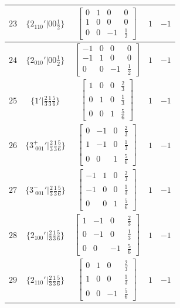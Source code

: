\documentclass[fleqn,8pt]{jsarticle}
\begin{document}
\begin{longtable}{ccccc}
$ 23 $ & $ \{2{}_{110}{}'|0 0 \frac{1}{2}\} $ & $ \begin{bmatrix} 0 & 1 & 0 & 0 \\ 1 & 0 & 0 & 0 \\ 0 & 0 & -1 & \frac{1}{2} \end{bmatrix} $ & $ 1 $ & $ -1 $ \\ \hline
$ 24 $ & $ \{2{}_{010}{}'|0 0 \frac{1}{2}\} $ & $ \begin{bmatrix} -1 & 0 & 0 & 0 \\ -1 & 1 & 0 & 0 \\ 0 & 0 & -1 & \frac{1}{2} \end{bmatrix} $ & $ 1 $ & $ -1 $ \\ \hline
$ 25 $ & $ \{1{}'|\frac{2}{3} \frac{1}{3} \frac{5}{6}\} $ & $ \begin{bmatrix} 1 & 0 & 0 & \frac{2}{3} \\ 0 & 1 & 0 & \frac{1}{3} \\ 0 & 0 & 1 & \frac{5}{6} \end{bmatrix} $ & $ 1 $ & $ -1 $ \\ \hline
$ 26 $ & $ \{3^{+}_{\,\,001}{}'|\frac{2}{3} \frac{1}{3} \frac{5}{6}\} $ & $ \begin{bmatrix} 0 & -1 & 0 & \frac{2}{3} \\ 1 & -1 & 0 & \frac{1}{3} \\ 0 & 0 & 1 & \frac{5}{6} \end{bmatrix} $ & $ 1 $ & $ -1 $ \\ \hline
$ 27 $ & $ \{3^{-}_{\,\,001}{}'|\frac{2}{3} \frac{1}{3} \frac{5}{6}\} $ & $ \begin{bmatrix} -1 & 1 & 0 & \frac{2}{3} \\ -1 & 0 & 0 & \frac{1}{3} \\ 0 & 0 & 1 & \frac{5}{6} \end{bmatrix} $ & $ 1 $ & $ -1 $ \\ \hline
$ 28 $ & $ \{2{}_{100}{}'|\frac{2}{3} \frac{1}{3} \frac{5}{6}\} $ & $ \begin{bmatrix} 1 & -1 & 0 & \frac{2}{3} \\ 0 & -1 & 0 & \frac{1}{3} \\ 0 & 0 & -1 & \frac{5}{6} \end{bmatrix} $ & $ 1 $ & $ -1 $ \\ \hline
$ 29 $ & $ \{2{}_{110}{}'|\frac{2}{3} \frac{1}{3} \frac{5}{6}\} $ & $ \begin{bmatrix} 0 & 1 & 0 & \frac{2}{3} \\ 1 & 0 & 0 & \frac{1}{3} \\ 0 & 0 & -1 & \frac{5}{6} \end{bmatrix} $ & $ 1 $ & $ -1 $ \\ \hline

\end{longtable}
\end{document}
